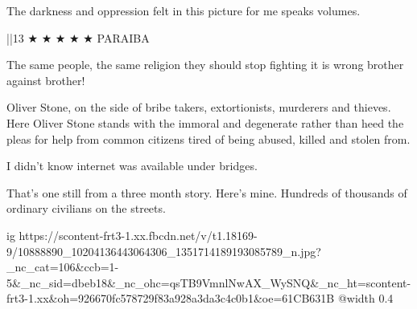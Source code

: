  
 
 
 
 


The darkness and oppression felt in this picture for me speaks volumes.

||13 ★ ★ ★ ★ ★
PARAIBA


The same people, the same religion they should stop fighting it is wrong brother against brother!


Oliver Stone, on the side of bribe takers, extortionists, murderers and
thieves. Here Oliver Stone stands with the immoral and degenerate rather than
heed the pleas for help from common citizens tired of being abused, killed and
stolen from.

I didn't know internet was available under bridges.


That's one still from a three month story. Here's mine. Hundreds of thousands
of ordinary civilians on the streets.

\ifcmt
  ig https://scontent-frt3-1.xx.fbcdn.net/v/t1.18169-9/10888890_10204136443064306_1351714189193085789_n.jpg?_nc_cat=106&ccb=1-5&_nc_sid=dbeb18&_nc_ohc=qsTB9VmnlNwAX_WySNQ&_nc_ht=scontent-frt3-1.xx&oh=926670fc578729f83a928a3da3c4c0b1&oe=61CB631B
  @width 0.4
\fi


